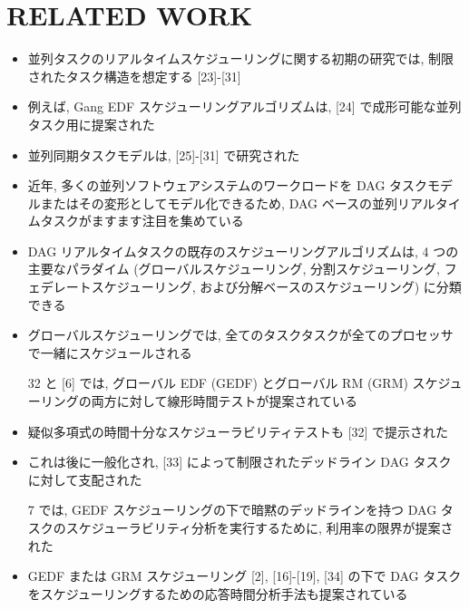 
\section{RELATED WORK}
\label{sec: related work}

\begin{frame}{}
    \begin{itemize}
        \item 並列タスクのリアルタイムスケジューリングに関する初期の研究では, 制限されたタスク構造を想定する [23]-[31]
\item 例えば, Gang EDF スケジューリングアルゴリズムは, [24] で成形可能な並列タスク用に提案された
\item 並列同期タスクモデルは, [25]-[31] で研究された
\item 近年, 多くの並列ソフトウェアシステムのワークロードを DAG タスクモデルまたはその変形としてモデル化できるため, DAG ベースの並列リアルタイムタスクがますます注目を集めている
    \end{itemize}
\end{frame}

\begin{frame}{}
    \begin{itemize}
        \item DAG リアルタイムタスクの既存のスケジューリングアルゴリズムは, 4 つの主要なパラダイム (グローバルスケジューリング, 分割スケジューリング, フェデレートスケジューリング, および分解ベースのスケジューリング) に分類できる
    \end{itemize}
\end{frame}

\begin{frame}{}
    \begin{itemize}
        \item グローバルスケジューリングでは, 全てのタスクタスクが全てのプロセッサで一緒にスケジュールされる
\item [32] と [6] では, グローバル EDF (GEDF) とグローバル RM (GRM) スケジューリングの両方に対して線形時間テストが提案されている
\item 疑似多項式の時間十分なスケジューラビリティテストも [32] で提示された
\item これは後に一般化され, [33] によって制限されたデッドライン DAG タスクに対して支配された
\item [7] では, GEDF スケジューリングの下で暗黙のデッドラインを持つ DAG タスクのスケジューラビリティ分析を実行するために, 利用率の限界が提案された
\item GEDF または GRM スケジューリング [2], [16]-[19], [34] の下で DAG タスクをスケジューリングするための応答時間分析手法も提案されている
    \end{itemize}
\end{frame}

